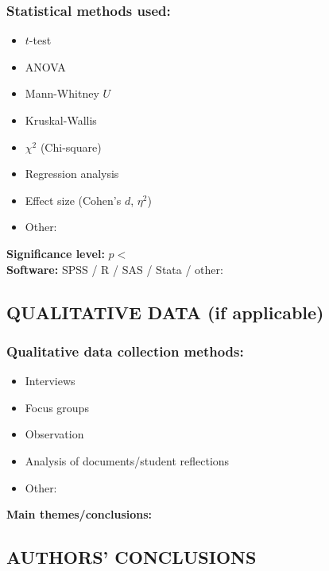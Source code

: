 \documentclass[
hf,
]{ceurart}
\begin{document}
\subsubsection*{Statistical methods used:}
\begin{itemize}[label=$\square$]
    \item $t$-test
    \item ANOVA
    \item Mann-Whitney $U$
    \item Kruskal-Wallis
    \item $\chi^2$ (Chi-square)
    \item Regression analysis
    \item Effect size (Cohen's $d$, $\eta^2$)
    \item Other: \underline{\hspace{4cm}}
\end{itemize}

\noindent\textbf{Significance level:} $p < $ \underline{\hspace{2cm}}\\
\textbf{Software:} SPSS / R / SAS / Stata / other: \underline{\hspace{3cm}}

\subsection*{QUALITATIVE DATA (if applicable)}

\subsubsection*{Qualitative data collection methods:}
\begin{itemize}[label=$\square$]
    \item Interviews
    \item Focus groups
    \item Observation
    \item Analysis of documents/student reflections
    \item Other: \underline{\hspace{4cm}}
\end{itemize}

\noindent\textbf{Main themes/conclusions:} \underline{\hspace{7cm}}

\subsection*{AUTHORS' CONCLUSIONS}
\end{document}
